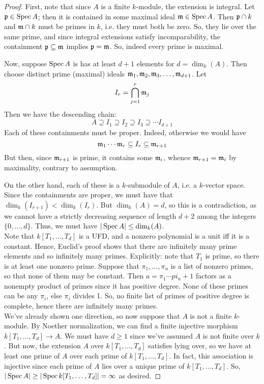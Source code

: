 \begin{proof}
	First, note that since $A$ is a finite $k$-module, the extension is integral. Let $\mathfrak{p} \in \operatorname{Spec} A$; then it is contained in some maximal ideal $\mathfrak{m} \in \operatorname{Spec} A$. Then $\mathfrak{p} \cap k$ and $\mathfrak{m} \cap k$ must be primes in $k$, i.e. they must both be zero. So, they lie over the same prime, and since integral extensions satisfy incomparability, the containment $\mathfrak{p} \subseteq \mathfrak{m}$ implies $\mathfrak{p} = \mathfrak{m}$. So, indeed every prime is maximal.
	
	Now, suppose $\operatorname{Spec} A$ is has at least $d+1$ elements for $d = \dim_k(A)$. Then choose distinct prime (maximal) ideals $\mathfrak{m}_1,\mathfrak{m}_2,\mathfrak{m}_3,\ldots,\mathfrak{m}_{d+1}$. Let
	\[ I_r = \bigcap_{j=1}^r \mathfrak{m}_j \]
	Then we have the descending chain:
	\[ A \supseteq I_1 \supseteq I_2 \supseteq I_3 \supseteq \cdots I_{d+1} \]
	Each of these containments must be proper. Indeed, otherwise we would have
	\[ \mathfrak{m}_1 \cdots \mathfrak{m}_r \subseteq I_r \subseteq \mathfrak{m}_{r+1} \]
	But then, since $\mathfrak{m}_{r+1}$ is prime, it contains some $\mathfrak{m}_i$, whence $\mathfrak{m}_{r+1} = \mathfrak{m}_i$ by maximality, contrary to assumption.
	
	On the other hand, each of these is a $k$-submodule of $A$, i.e. a $k$-vector space. Since the containments are proper, we must have that $\dim_k(I_{r+1}) < \dim_k(I_r)$. But $\dim_k(A)=d$, so this is a contradiction, as we cannot have a strictly decreasing sequence of length $d+2$ among the integers $\{0,\ldots,d\}$. Thus, we must have $|\operatorname{Spec} A| \leq \dim_k(A)$. \\
	
	Note that $k[T_1,\ldots,T_d]$ is a UFD, and a nonzero polynomial is a unit iff it is a constant. Hence, Euclid's proof shows that there are infinitely many prime elements and so infinitely many primes. Explicitly: note that $T_1$ is prime, so there is at least one nonzero prime. Suppose that $\pi_1,\ldots,\pi_n$ is a list of nonzero primes, so that none of them may be constant. Then $a = \pi_1 \cdots pi_n + 1$ factors as a nonempty product of primes since it has positive degree. None of these primes can be any $\pi_i$, else $\pi_i$ divides 1. So, no finite list of primes of positive degree is complete, hence there are infinitely many primes. \\
	
	We've already shown one direction, so now suppose that $A$ is not a finite $k$-module. By Noether normalization, we can find a finite injective morphism $k[T_1,\ldots,T_d] \to A$. We must have $d \geq 1$ since we've assumed $A$ is not finite over $k$. But now, the extension $A$ over $k[T_1,\ldots,T_d]$ satisfies lying over, so we have at least one prime of $A$ over each prime of $k[T_1,\ldots,T_d]$. In fact, this association is injective since each prime of $A$ lies over a unique prime of $k[T_1,\ldots,T_d]$. So, $|\operatorname{Spec} A| \geq |\operatorname{Spec} k[T_1,\ldots,T_d]| = \infty$ as desired.
\end{proof}
